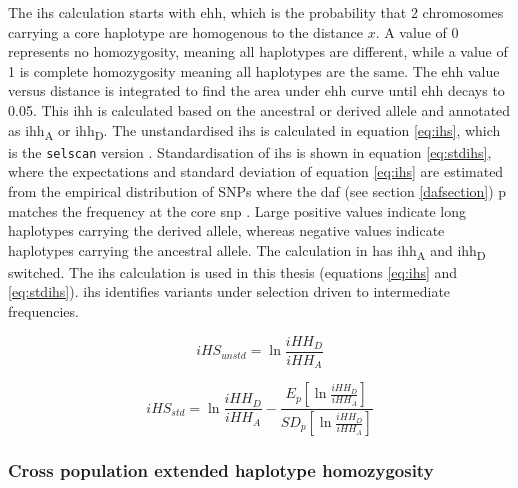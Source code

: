 \documentclass[]{report}
\begin{document}
The \gls{ihs} \citep{voight2006map, Szpiech2014} calculation starts with
\gls{ehh}, which is the probability that 2 chromosomes carrying a core
haplotype are homogenous to the distance \(x\). A value of 0 represents
no homozygosity, meaning all haplotypes are different, while a value of
1 is complete homozygosity meaning all haplotypes are the same. The
\gls{ehh} value versus distance is integrated to find the area under
\gls{ehh} curve until \gls{ehh} decays to 0.05. This \gls{ihh} is
calculated based on the ancestral or derived allele and annotated as
\gls{ihh}\textsubscript{A} or \gls{ihh}\textsubscript{D}. The
unstandardised \gls{ihs} is calculated in equation \eqref{eq:ihs}, which
is the \texttt{selscan} version \citep{Szpiech2014}. Standardisation of
\gls{ihs} is shown in equation \eqref{eq:stdihs}, where the expectations
and standard deviation of equation \eqref{eq:ihs} are estimated from the
empirical distribution of SNPs where the \gls{daf} (see section
\ref{dafsection}) p matches the frequency at the core \gls{snp}
\citep{voight2006map}. Large positive values indicate long haplotypes
carrying the derived allele, whereas negative values indicate haplotypes
carrying the ancestral allele. The calculation in \citet{voight2006map}
has \gls{ihh}\textsubscript{A} and \gls{ihh}\textsubscript{D} switched.
The \citet{Szpiech2014} \gls{ihs} calculation is used in this thesis
(equations \eqref{eq:ihs} and \eqref{eq:stdihs}). \Gls{ihs} identifies
variants under selection driven to intermediate frequencies.

\begin{equation} 
iHS_{unstd} = \ln{\frac{iHH_D}{iHH_A}}
\label{eq:ihs}
\end{equation}

\begin{equation} 
iHS_{std} = \ln{\frac{iHH_D}{iHH_A}} - \frac{E_p [\ln{\frac{iHH_D}{iHH_A}}] }{ SD_p [\ln{\frac{iHH_D}{iHH_A}}] }
\label{eq:stdihs}
\end{equation}

\subsubsection{Cross population extended haplotype
homozygosity}\label{cross-population-extended-haplotype-homozygosity}
\end{document}
